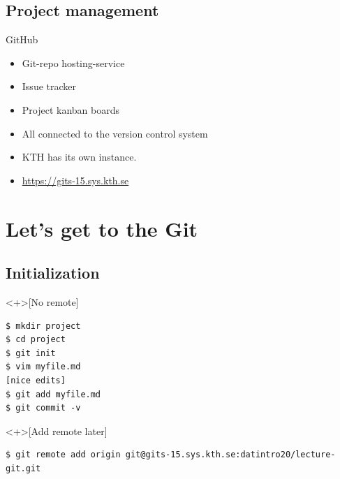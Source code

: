 \subsection{Project management}

\begin{frame}
  \begin{block}{GitHub}
    \begin{itemize}
      \item Git-repo hosting-service
      \item Issue tracker
      \item Project kanban boards
      \item All connected to the version control system
    \end{itemize}
  \end{block}
\end{frame}


\begin{frame}
  \begin{remark}
    \begin{itemize}
      \item KTH has its own instance.
      \item \url{https://gits-15.sys.kth.se}
    \end{itemize}
  \end{remark}
\end{frame}


\section{Let's get to the Git}

\subsection{Initialization}

\begin{frame}[fragile]
  \begin{example}<+>[No remote]
    \begin{lstlisting}
$ mkdir project
$ cd project
$ git init
$ vim myfile.md
[nice edits]
$ git add myfile.md
$ git commit -v
    \end{lstlisting}
  \end{example}

  \begin{example}<+>[Add remote later]
    \begin{lstlisting}
$ git remote add origin git@gits-15.sys.kth.se:datintro20/lecture-git.git
    \end{lstlisting}
  \end{example}
\end{frame}

